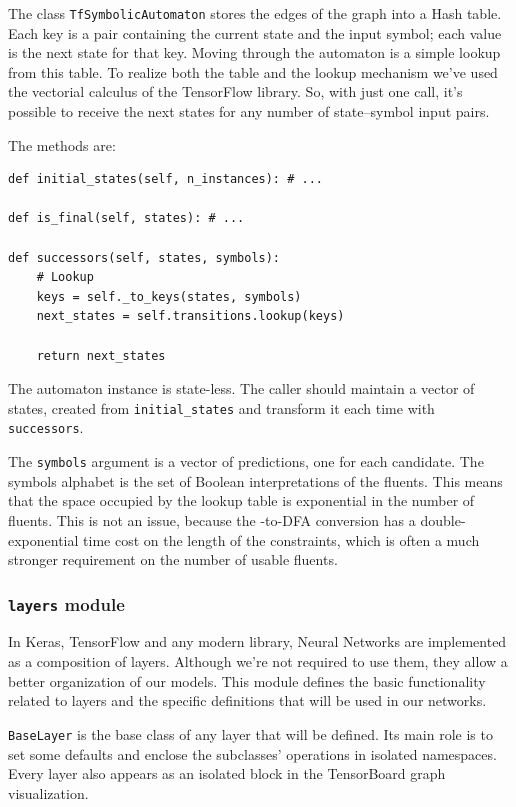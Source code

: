 The class \texttt{TfSymbolicAutomaton} stores the edges of the graph into a
Hash table. Each key is a pair containing the current state and the input
symbol; each value is the next state for that key. Moving through the
automaton is a simple lookup from this table. To realize both the table and
the lookup mechanism we've used the vectorial calculus of the TensorFlow
library. So, with just one call, it's possible to receive the next states for
any number of state--symbol input pairs.

The methods are:
\begin{verbatim}
def initial_states(self, n_instances): # ...

def is_final(self, states): # ...

def successors(self, states, symbols):
	# Lookup
	keys = self._to_keys(states, symbols)
	next_states = self.transitions.lookup(keys)
	
	return next_states
\end{verbatim}
The automaton instance is state-less. The caller should maintain a vector of
states, created from \verb|initial_states| and transform it each time with
\texttt{successors}.

The \texttt{symbols} argument is a vector of predictions, one for each
candidate.  The symbols alphabet is the set of Boolean interpretations of the
fluents.  This means that the space occupied by the lookup table is
exponential in the number of fluents. This is not an issue, because the
\ldl{}-to-DFA conversion has a double-exponential time cost on the length of
the constraints, which is often a much stronger requirement on the number of
usable fluents.


\subsubsection*{\texttt{layers} module}

In Keras, TensorFlow and any modern library, Neural Networks are implemented
as a composition of layers. Although we're not required to use them, they
allow a better organization of our models. This module defines the basic
functionality related to layers and the specific definitions that will be used
in our networks.

\texttt{BaseLayer} is the base class of any layer that will be defined.
Its main role is to set some defaults and enclose the subclasses' operations
in isolated namespaces. Every layer also appears as an isolated block in the
TensorBoard graph visualization.

